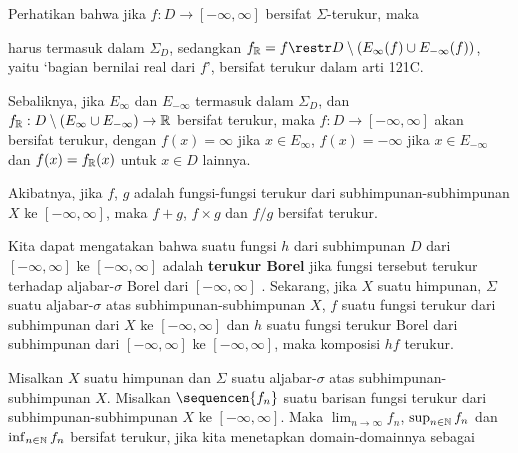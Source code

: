  Perhatikan bahwa jika
$f:D\to[-\infty,\infty]$ bersifat $\Sigma$-terukur, maka


\noindent harus termasuk dalam $\Sigma_D$, sedangkan
$f_{\Bbb R}=f\restr D\setminus(E_{\infty}(f)\cup E_{-\infty}(f))$, yaitu
`bagian bernilai real dari $f$', bersifat terukur dalam arti 121C.

 Sebaliknya, jika $E_{\infty}$ dan $E_{-\infty}$
termasuk dalam $\Sigma_D$, dan
$f_{\Bbb R}:D\setminus(E_{\infty}\cup E_{-\infty})\to\Bbb R$ bersifat
terukur, maka $f:D\to[-\infty,\infty]$ akan bersifat terukur, dengan
$f(x)=\infty$ jika $x\in E_{\infty}$, $f(x)=-\infty$ jika
$x\in E_{-\infty}$ dan $f(x)=f_{\Bbb R}(x)$ untuk $x\in D$ lainnya.

 Akibatnya, jika $f$, $g$ adalah fungsi-fungsi
terukur dari subhimpunan-subhimpunan $X$ ke $[-\infty,\infty]$, maka
$f+g$, $f\times g$ dan $f/g$ bersifat terukur. 

 Kita dapat mengatakan bahwa suatu fungsi $h$ dari
subhimpunan $D$ dari $[-\infty,\infty]$ ke $[-\infty,\infty]$ adalah
{\bf terukur Borel} jika fungsi tersebut terukur terhadap aljabar-$\sigma$ Borel dari $[-\infty,\infty]$
. Sekarang, jika $X$ suatu
himpunan, $\Sigma$ suatu aljabar-$\sigma$ atas subhimpunan-subhimpunan $X$,
$f$ suatu fungsi terukur dari subhimpunan dari $X$ ke $[-\infty,\infty]$ dan
$h$ suatu fungsi terukur Borel dari subhimpunan dari $[-\infty,\infty]$ ke
$[-\infty,\infty]$, maka komposisi $hf$ terukur.

 Misalkan $X$ suatu himpunan dan $\Sigma$ suatu
aljabar-$\sigma$ atas subhimpunan-subhimpunan $X$. Misalkan
$\sequencen{f_n}$ suatu barisan fungsi terukur dari
subhimpunan-subhimpunan $X$ ke $[-\infty,\infty]$. Maka
$\lim_{n\to\infty}f_n$, $\sup_{n\in\Bbb N}f_n$ dan
$\inf_{n\in\Bbb N}f_n$ bersifat terukur, jika kita menetapkan domain-domainnya
sebagai

